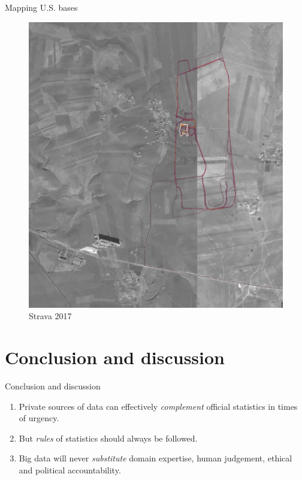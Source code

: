 \documentclass[ignorenonframetext,aspectratio=54,]{beamer}
\providecommand{\tightlist}{%
  \setlength{\itemsep}{0pt}\setlength{\parskip}{0pt}}
\begin{document}
\begin{frame}{Mapping U.S. bases}
\protect\hypertarget{mapping-u.s.-bases}{}

\begin{figure}
\centering
\includegraphics{exhibit/fig/strava.jpeg}
\caption{Strava 2017}
\end{figure}

\end{frame}

\hypertarget{conclusion-and-discussion}{%
\section{Conclusion and discussion}\label{conclusion-and-discussion}}

\begin{frame}{Conclusion and discussion}
\protect\hypertarget{conclusion-and-discussion-1}{}

\begin{enumerate}
\tightlist
\item
  Private sources of data can effectively \emph{complement} official
  statistics in times of urgency.
\item
  But \emph{rules} of statistics should always be followed.
\item
  Big data will never \emph{substitute} domain expertise, human
  judgement, ethical and political accountability.
\end{enumerate}

\end{frame}
\end{document}
